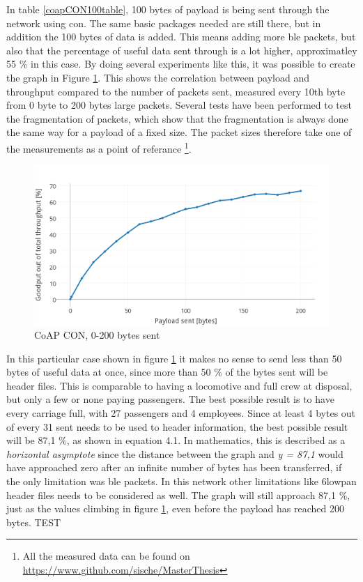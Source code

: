 \noindent In table \ref{coapCON100table}, 100 bytes of \gls{payload} is being sent through the network using \gls{con}. The same basic packages needed are still there, but in addition the 100 bytes of data is added. This means adding more \gls{ble} packets, but also that the percentage of useful data sent through is a lot higher, approximatley 55 \% in this case. By doing several experiments like this, it was possible to create the graph in Figure \ref{fig:coapCON0200}. This shows the correlation between \gls{payload} and \gls{throughput} compared to the number of packets sent, measured every 10th byte from 0 byte to 200 bytes large packets. Several tests have been performed to test the fragmentation of packets, which show that the fragmentation is always done the same way for a \gls{payload} of a fixed size. The packet sizes therefore take one of the measurements as a point of referance \footnote{All the measured data can be found on \url{https://www.github.com/sische/MasterThesis}}.


\begin{figure}[ht]
    \centering
    \includegraphics[scale=1.0]{CoAPCON_0-200_Thicker3.png}    
    \caption{CoAP CON, 0-200 bytes sent}
    \label{fig:coapCON0200}
\end{figure}

\noindent In this particular case shown in figure \ref{fig:coapCON0200} it makes no sense to send less than 50 bytes of useful data at once, since more than 50 \% of the bytes sent will be header files. This is comparable to having a locomotive and full crew at disposal, but only a few or none paying passengers. The best possible result is to have every carriage full, with 27 passengers and 4 employees. Since at least 4 bytes out of every 31 sent needs to be used to header information, the best possible result will be 87,1 \%, as shown in equation 4.1. In mathematics, this is described as a \textit{horizontal asymptote} since the distance between the graph and \textit{y = 87,1} would have approached zero after an infinite number of bytes has been transferred, if the only limitation was \gls{ble} packets. In this network other limitations like \gls{6lowpan} header files needs to be considered as well. The graph will still approach 87,1 \%, just as the values climbing in figure \ref{fig:coapCON0200}, even before the \gls{payload} has reached 200 bytes.   TEST

